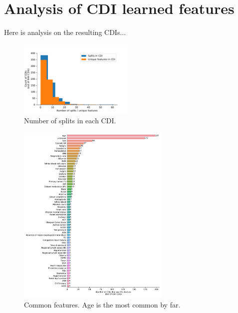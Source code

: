 \documentclass[10pt]{article}
\begin{document}
\section{Analysis of CDI learned features}

Here is analysis on the resulting CDIs...

\begin{figure}[H]
    \centering
    \includegraphics[width=0.49\textwidth]{../results/num_rules_hist.pdf}
    \caption{Number of splits in each CDI.}
\end{figure}

\begin{figure}[H]
    \centering
    \includegraphics[width=0.65\textwidth]{../results/common_features.pdf}
    \caption{Common features. Age is the most common by far.}
\end{figure}
\end{document}
